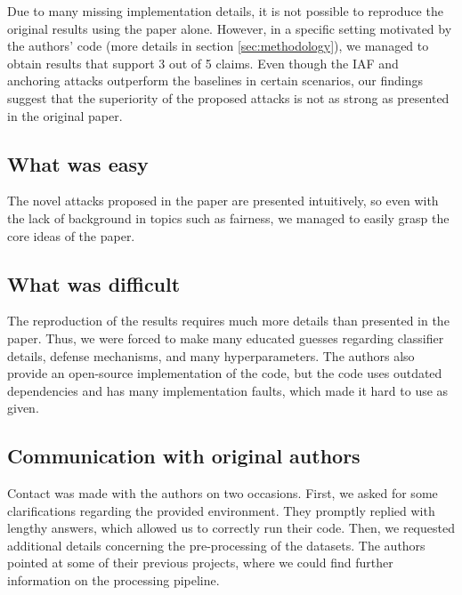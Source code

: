 Due to many missing implementation details, it is not possible to reproduce the original results using the paper alone. However, in a specific setting motivated by the authors' code (more details in section \ref{sec:methodology}), we managed to obtain results that support 3 out of 5 claims. Even though the IAF and anchoring attacks outperform the baselines in certain scenarios, our findings suggest that the superiority of the proposed attacks is not as strong as presented in the original paper. 

\subsection*{What was easy}

The novel attacks proposed in the paper are presented intuitively, so even with the lack of background in topics such as fairness, we managed to easily grasp the core ideas of the paper. 
\subsection*{What was difficult}

The reproduction of the results requires much more details than presented in the paper. Thus, we were forced to make many educated guesses regarding classifier details, defense mechanisms, and many hyperparameters. The authors also provide an open-source implementation of the code, but the code uses outdated dependencies and has many implementation faults, which made it hard to use as given. 
\subsection*{Communication with original authors}

Contact was made with the authors on two occasions. First, we asked for some clarifications regarding the provided environment. They promptly replied with lengthy answers, which allowed us to correctly run their code. Then, we requested additional details concerning the pre-processing of the datasets. The authors pointed at some of their previous projects, where we could find further information on the processing pipeline.